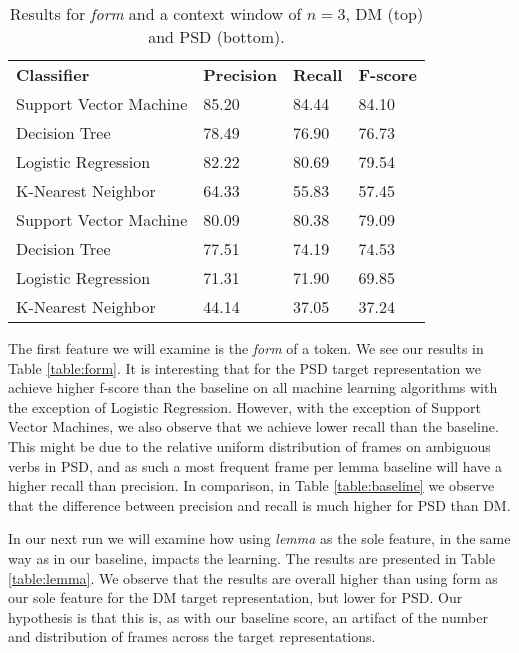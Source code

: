 \begin{table}
    \centering
    \smaller[0.2]
    \begin{tabular}{@{}llll@{}}
        \toprule
        \textbf{Classifier} & \textbf{Precision} & \textbf{Recall} & \textbf{F-score} \\
        Support Vector Machine & 85.20 & 84.44 & 84.10 \\
        Decision Tree & 78.49 & 76.90 & 76.73 \\
        Logistic Regression & 82.22 & 80.69 & 79.54 \\
        K-Nearest Neighbor & 64.33 & 55.83 & 57.45 \\
        \midrule
        Support Vector Machine & 80.09 & 80.38 & 79.09 \\
        Decision Tree & 77.51 & 74.19 & 74.53 \\
        Logistic Regression & 71.31 & 71.90 & 69.85 \\
        K-Nearest Neighbor & 44.14 & 37.05 & 37.24 \\
        \bottomrule
    \end{tabular}
    \caption{Results for \textit{form} and a context window of $n=3$, DM (top) and PSD (bottom).}
    \label{table:form_lemma_context=3}
\end{table}

The first feature we will examine is the \textit{form} of a token. We see our results in Table \ref{table:form}. It is interesting that for the PSD target representation we achieve higher f-score than the baseline on all machine learning algorithms with the exception of Logistic Regression. However, with the exception of Support Vector Machines, we also observe that we achieve lower recall than the baseline. This might be due to the relative uniform distribution of frames on ambiguous verbs in PSD, and as such a most frequent frame per lemma baseline will have a higher recall than precision. In comparison, in Table \ref{table:baseline} we observe that the difference between precision and recall is much higher for PSD than DM.

In our next run we will examine how using \textit{lemma} as the sole feature, in the same way as in our baseline, impacts the learning. The results are presented in Table \ref{table:lemma}. We observe that the results are overall higher than using form as our sole feature for the DM target representation, but lower for PSD. Our hypothesis is that this is, as with our baseline score, an artifact of the number and distribution of frames across the target representations.

